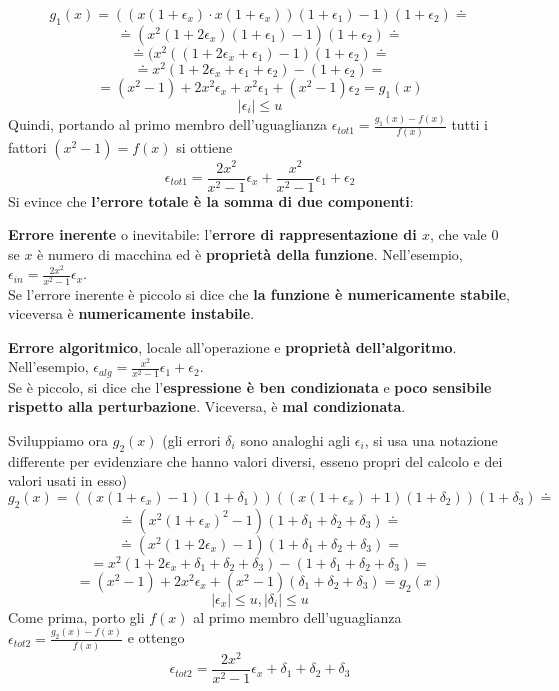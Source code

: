 \documentclass[10pt]{book}
\begin{document}
$$g_1(x) = ((x(1+\epsilon_x)\cdot x(1 + \epsilon_x))(1 + \epsilon_1) - 1)(1 + \epsilon_2) \doteq$$
$$\doteq (x^2(1 + 2\epsilon_x)(1 + \epsilon_1) - 1)(1 + \epsilon_2) \doteq$$
$$\doteq (x^2 ((1 + 2\epsilon_x + \epsilon_1) - 1)(1 + \epsilon_2) \doteq$$
$$\doteq x^2(1 + 2\epsilon_x + \epsilon_1 + \epsilon_2) - (1 + \epsilon_2) =$$
$$= (x^2 - 1) + 2x^2\epsilon_x + x^2\epsilon_1 + (x^2 - 1)\epsilon_2 = g_1(x)$$
$$|\epsilon_i| \leq u$$ Quindi, portando al primo membro dell'uguaglianza $\epsilon_{tot1} = \frac{g_1(x) - f(x)}{f(x)}$ tutti i fattori $(x^2 - 1) = f(x)$ si ottiene $$\epsilon_{tot1} = \frac{2x^2}{x^2 - 1}\epsilon_x + \frac{x^2}{x^2 - 1}\epsilon_1 + \epsilon_2$$ Si evince che \textbf{l'errore totale è la somma di due componenti}:
\begin{list}{}{}
	\item \textbf{Errore inerente} o inevitabile: l'\textbf{errore di rappresentazione di $x$}, che vale 0 se $x$ è numero di macchina ed è \textbf{proprietà della funzione}. Nell'esempio, $\epsilon_{in} = \frac{2x^2}{x^2 - 1}\epsilon_x$.\\
	Se l'errore inerente è piccolo si dice che \textbf{la funzione è numericamente stabile}, viceversa è \textbf{numericamente instabile}.
	\item \textbf{Errore algoritmico}, locale all'operazione e \textbf{proprietà dell'algoritmo}. Nell'esempio, $\epsilon_{alg} = \frac{x^2}{x^2 - 1}\epsilon_1 + \epsilon_2$.\\
	Se è piccolo, si dice che l'\textbf{espressione è ben condizionata} e \textbf{poco sensibile rispetto alla perturbazione}. Viceversa, è \textbf{mal condizionata}.
\end{list}
\pagebreak
Sviluppiamo ora $g_2(x)$ (gli errori $\delta_i$ sono analoghi agli $\epsilon_i$, si usa una notazione differente per evidenziare che hanno valori diversi, esseno propri del calcolo e dei valori usati in esso)
$$g_2(x) = ((x(1 + \epsilon_x) - 1)(1 + \delta_1))((x(1 + \epsilon_x) + 1)(1 + \delta_2))(1 + \delta_3) \doteq$$
$$\doteq (x^2(1 + \epsilon_x)^2 - 1)(1 + \delta_1 + \delta_2 + \delta_3) \doteq$$
$$\doteq (x^2(1 + 2\epsilon_x) - 1)(1 + \delta_1 + \delta_2 + \delta_3) =$$
$$= x^2(1 + 2\epsilon_x + \delta_1 + \delta_2 + \delta_3) - (1 + \delta_1 + \delta_2 + \delta_3) =$$
$$= (x^2 - 1) + 2x^2\epsilon_x + (x^2 - 1)(\delta_1 + \delta_2 + \delta_3) = g_2(x)$$
$$|\epsilon_x| \leq u, |\delta_i| \leq u$$
Come prima, porto gli $f(x)$ al primo membro dell'uguaglianza $\epsilon_{tot2} = \frac{g_2(x) - f(x)}{f(x)}$ e ottengo
$$\epsilon_{tot2} = \frac{2x^2}{x^2 - 1}\epsilon_x + \delta_1 + \delta_2 + \delta_3$$
\end{document}
